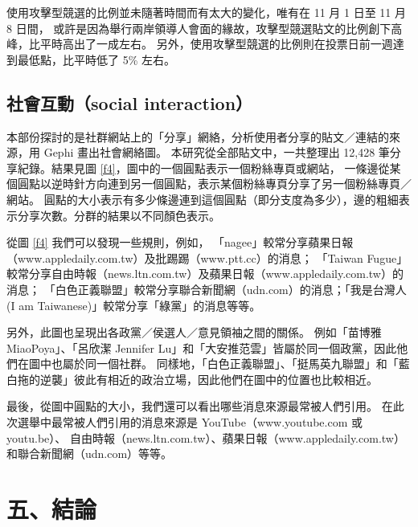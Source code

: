 \documentclass[a4paper, 10pt, conference]{ieeeconf}       %
\begin{document}
\begin{CJK}{UTF8}{bsmi}
使用攻擊型競選的比例並未隨著時間而有太大的變化，唯有在 11 月 1 日至 11 月 8 日間，%
或許是因為舉行兩岸領導人會面的緣故，攻擊型競選貼文的比例創下高峰，比平時高出了一成左右。%
另外，使用攻擊型競選的比例則在投票日前一週達到最低點，比平時低了 5\% 左右。%

\subsection*{社會互動（social interaction）}

本部份探討的是社群網站上的「分享」網絡，分析使用者分享的貼文／連結的來源，用 Gephi 畫出社會網絡圖。%
本研究從全部貼文中，一共整理出 12,428 筆分享紀錄。結果見圖 \ref{f4}，圖中的一個圓點表示一個粉絲專頁或網站，%
一條邊從某個圓點以逆時針方向連到另一個圓點，表示某個粉絲專頁分享了另一個粉絲專頁／網站。%
圓點的大小表示有多少條邊連到這個圓點（即分支度為多少），邊的粗細表示分享次數。分群的結果以不同顏色表示。%

從圖 \ref{f4} 我們可以發現一些規則，例如，%
「nagee」較常分享蘋果日報（www.appledaily.com.tw）及批踢踢（www.ptt.cc）的消息；%
「Taiwan Fugue」較常分享自由時報（news.ltn.com.tw）及蘋果日報（www.appledaily.com.tw）的消息；%
「白色正義聯盟」較常分享聯合新聞網（udn.com）的消息；「我是台灣人 (I am Taiwanese)」較常分享「綠黨」的消息等等。%

另外，此圖也呈現出各政黨／侯選人／意見領袖之間的關係。%
例如「苗博雅 MiaoPoya」、「呂欣潔 Jennifer Lu」和「大安推范雲」皆屬於同一個政黨，因此他們在圖中也屬於同一個社群。%
同樣地，「白色正義聯盟」、「挺馬英九聯盟」和「藍白拖的逆襲」彼此有相近的政治立場，因此他們在圖中的位置也比較相近。%

\addtolength{\textheight}{-4.8cm} %

最後，從圖中圓點的大小，我們還可以看出哪些消息來源最常被人們引用。%
在此次選舉中最常被人們引用的消息來源是 YouTube（www.youtube.com 或 youtu.be）、%
自由時報（news.ltn.com.tw）、蘋果日報（www.appledaily.com.tw）和聯合新聞網（udn.com）等等。%

\section*{五、結論}


\end{CJK}
\end{document}
